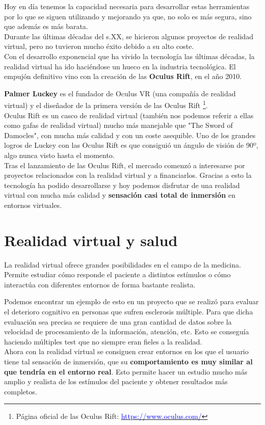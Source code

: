 \documentclass[twoside, 11pt]{epstfg}
\begin{document}
Hoy en día tenemos la capacidad necesaria para desarrollar estas herramientas por lo que se siguen utilizando y mejorando ya que, no solo es más segura, sino que además es más barata.\\
Durante las últimas décadas del s.XX, se hicieron algunos proyectos de realidad virtual, pero no tuvieron mucho éxito debido a su alto coste.\\
Con el desarrollo exponencial que ha vivido la tecnología las últimas décadas, la realidad virtual ha ido haciéndose un hueco en la industria tecnológica.
El empujón definitivo vino con la creación de las \textbf{Oculus Rift}, en el año 2010.

\textbf{Palmer Luckey} es el fundador de Oculus VR (una compañía de realidad virtual) y el diseñador de la primera versión de las Oculus Rift \footnote{Página oficial de las Oculus Rift: \href{https://www.oculus.com/}{\textcolor{blue}{https://www.oculus.com/}}}.\\
Oculus Rift es un casco de realidad virtual (también nos podemos referir a ellas como gafas de realidad virtual) mucho más manejable que "The Sword of Damocles", con mucha más calidad y con un coste asequible.
Uno de los grandes logros de Luckey con las Oculus Rift es que consiguió un ángulo de visión de 90º, algo nunca visto hasta el momento.\\
Tras el lanzamiento de las Oculus Rift, el mercado comenzó a interesarse por proyectos relacionados con la realidad virtual y a financiarlos.
Gracias a esto la tecnología ha podido desarrollarse y hoy podemos disfrutar de una realidad virtual con mucha más calidad y \textbf{sensación casi total de inmersión} en entornos virtuales.




\section{Realidad virtual y salud}
\label{sec:VR y salud}

La realidad virtual ofrece grandes posibilidades en el campo de la medicina. Permite estudiar cómo responde el paciente a distintos estímulos o cómo interactúa con diferentes entornos de forma bastante realista.

Podemos encontrar un ejemplo de esto en un proyecto que se realizó para evaluar el deterioro cognitivo en personas que sufren esclerosis múltiple. Para que dicha evaluación sea precisa se requiere de una gran cantidad de datos sobre la velocidad de procesamiento de la información, atención, etc. Esto se conseguía haciendo múltiples test que no siempre eran fieles a la realidad.\\
Ahora con la realidad virtual se consiguen crear entornos en los que el usuario tiene tal sensación de inmersión, que su \textbf{comportamiento es muy similar al que tendría en el entorno real}. Esto permite hacer un estudio mucho más amplio y realista de los estímulos del paciente y obtener resultados más completos.\cite{LamargueHamel201594}
\end{document}
